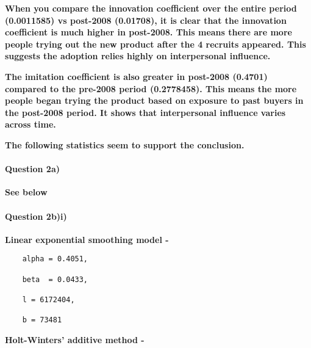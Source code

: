 \documentclass[]{article}
\newenvironment{Shaded}{\begin{snugshade}}{\end{snugshade}}
\newcommand{\CommentTok}[1]{\textcolor[rgb]{0.56,0.35,0.01}{\textit{#1}}}
\newcommand{\DataTypeTok}[1]{\textcolor[rgb]{0.13,0.29,0.53}{#1}}
\newcommand{\KeywordTok}[1]{\textcolor[rgb]{0.13,0.29,0.53}{\textbf{#1}}}
\newcommand{\NormalTok}[1]{#1}
\newcommand{\OperatorTok}[1]{\textcolor[rgb]{0.81,0.36,0.00}{\textbf{#1}}}
\newcommand{\OtherTok}[1]{\textcolor[rgb]{0.56,0.35,0.01}{#1}}
\newcommand{\StringTok}[1]{\textcolor[rgb]{0.31,0.60,0.02}{#1}}
\let\oldparagraph\paragraph
\renewcommand{\paragraph}[1]{\oldparagraph{#1}\mbox{}}
\begin{document}
\textbf{When you compare the innovation coefficient over the entire
period (0.0011585) vs post-2008 (0.01708), it is clear that the
innovation coefficient is much higher in post-2008. This means there are
more people trying out the new product after the 4 recruits appeared.
This suggests the adoption relies highly on interpersonal influence.}

\textbf{The imitation coefficient is also greater in post-2008 (0.4701)
compared to the pre-2008 period (0.2778458). This means the more people
began trying the product based on exposure to past buyers in the
post-2008 period. It shows that interpersonal influence varies across
time.}

\textbf{The following statistics seem to support the conclusion.}

\hypertarget{question-2a}{%
\paragraph{Question 2a)}\label{question-2a}}

\textbf{See below}

\begin{Shaded}
\end{Shaded}

\hypertarget{question-2bi}{%
\paragraph{Question 2b)i)}\label{question-2bi}}

\textbf{Linear exponential smoothing model - }

\begin{verbatim}
    alpha = 0.4051,
    
    beta  = 0.0433,
    
    l = 6172404,  
    
    b = 73481
\end{verbatim}

\textbf{Holt-Winters' additive method -}
\end{document}

